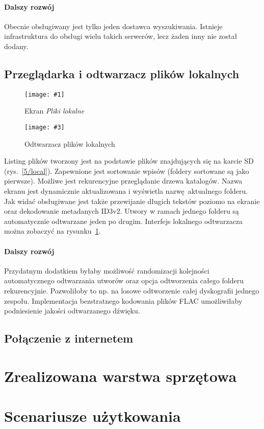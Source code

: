 \documentclass[12pt]{report}
\newcommand{\imgintss}[5]{
	\begin{figure}[{#5}]
		\centering
		\begin{minipage}{.45\textwidth}
			\centering
			\texttt{[image: \#1]}
			\caption{#2}
			\label{#1}
		\end{minipage}%
		\hfill
		\begin{minipage}{.45\textwidth}
			\centering
			\texttt{[image: \#3]}
			\caption{#4}
			\label{#3}
		\end{minipage}
	\end{figure}
}
\newcommand{\imghss}[4]{\imgintss{#1}{#2}{#3}{#4}{H}}
\begin{document}
			\paragraph{Dalszy rozwój}
				Obecnie obsługiwany jest tylko jeden dostawca wyszukiwania. Istnieje infrastruktura do obsługi wielu takich serwerów, lecz żaden inny nie został dodany.
			
		\subsection{Przeglądarka i odtwarzacz plików lokalnych}
			\imghss{5/local}{Ekran \textit{Pliki lokalne}}{5/local_play}{Odtwarzacz plików lokalnych}
			Listing plików tworzony jest na podstawie plików znajdujących się na karcie SD (rys.~\ref{5/local}). Zapewnione jest sortowanie wpisów (foldery sortowane są jako pierwsze). Możliwe jest rekurencyjne przeglądanie drzewa katalogów. Nazwa ekranu jest dynamicznie aktualizowana i wyświetla nazwę aktualnego folderu. Jak widać obsługiwane jest także przewijanie długich tekstów poziomo na ekranie oraz dekodowanie metadanych ID3v2. Utwory w ramach jednego folderu są automatycznie odtwarzane jeden po drugim. Interfejs lokalnego odtwarzacza można zobaczyć na rysunku~\ref{5/local_play}.
			
			\paragraph{Dalszy rozwój}
				Przydatnym dodatkiem byłaby możliwość randomizacji kolejności automatycznego odtwarzania utworów oraz opcja odtworzenia całego folderu rekurencyjnie. Pozwoliłoby to np. na losowe odtworzenie całej dyskografii jednego zespołu. Implementacja bezstratnego kodowania plików FLAC umożliwiłaby podniesienie jakości odtwarzanego dźwięku.
		
		\subsection{Połączenie z internetem}
			
	\section{Zrealizowana warstwa sprzętowa}
	\section{Scenariusze użytkowania}
			
\end{document}
